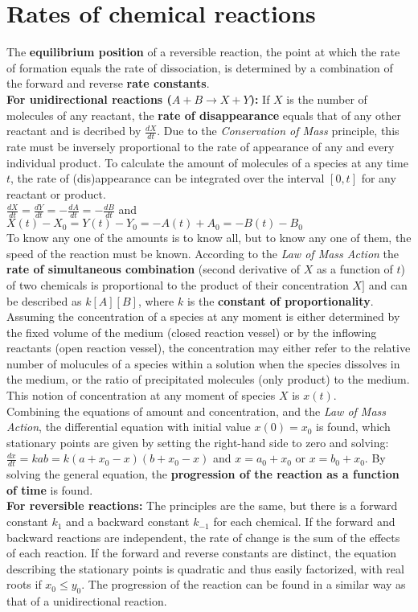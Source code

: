 \documentclass{article}
\begin{document}
	\section{Rates of chemical reactions}
		The \textbf{equilibrium position} of a reversible reaction, the point at which the rate of formation equals the rate of dissociation, is determined by a combination of the forward and reverse \textbf{rate constants}.\\
		\textbf{For unidirectional reactions ($A + B \rightarrow X + Y$):} If $X$ is the number of molecules of any reactant, the \textbf{rate of disappearance} equals that of any other reactant and is decribed by $\frac{dX}{dt}$. Due to the \emph{Conservation of Mass} principle, this rate must be inversely proportional to the rate of appearance of any and every individual product. To calculate the amount of molecules of a species at any time $t$, the rate of (dis)appearance can be integrated over the interval $[0,t]$ for any reactant or product.\\
		$\frac{dX}{dt} = \frac{dY}{dt} = -\frac{dA}{dt} = -\frac{dB}{dt}$ and $X(t) - X_0 = Y(t) - Y_0 = -A(t) + A_0 = -B(t) - B_0$\\
		To know any one of the amounts is to know all, but to know any one of them, the speed of the reaction must be known. According to the \emph{Law of Mass Action} the \textbf{rate of simultaneous combination} (second derivative of $X$ as a function of $t$) of two chemicals is proportional to the product of their concentration $X]$ and can be described as $k[A][B]$, where $k$ is the \textbf{constant of proportionality}.\\
		Assuming the concentration of a species at any moment is either determined by the fixed volume of the medium (closed reaction vessel) or by the inflowing reactants (open reaction vessel), the concentration may either refer to the relative number of molucules of a species within a solution when the species dissolves in the medium, or the ratio of precipitated molecules (only product) to the medium. This notion of concentration at any moment of species $X$ is $x(t)$.\\
		Combining the equations of amount and concentration, and the \emph{Law of Mass Action}, the differential equation with initial value $x(0) = x_0$ is found, which stationary points are given by setting the right-hand side to zero and solving: $\frac{dx}{dt} = kab = k(a + x_0 - x)(b + x_0 - x)$ and $x = a_0 + x_0$ or $x = b_0 + x_0$. By solving the general equation, the \textbf{progression of the reaction as a function of time} is found.\\
		\textbf{For reversible reactions:} The principles are the same, but there is a forward constant $k_1$ and a backward constant $k_{-1}$ for each chemical. If the forward and backward reactions are independent, the rate of change is the sum of the effects of each reaction. If the forward and reverse constants are distinct, the equation describing the stationary points is quadratic and thus easily factorized, with real roots if $x_0 \leq y_0$. The progression of the reaction can be found in a similar way as that of a unidirectional reaction.
\end{document}
